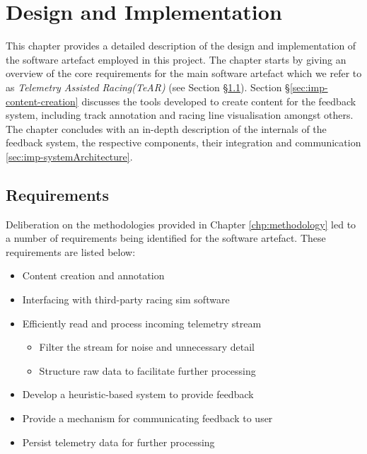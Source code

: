 \def \methodname {TeAR\xspace}
\def \methodnamefull {Telemetry Assisted Racing\xspace}

\chapter{Design and Implementation}
This chapter provides a detailed description of the design and implementation of the software artefact employed in this project. The chapter starts by giving an overview of the core requirements for the main software artefact which we refer to as \emph{\methodnamefull (\methodname)} (see Section \S\ref{sec:imp-requirements}). Section \S\ref{sec:imp-content-creation} discusses the tools developed to create content for the feedback system, including track annotation and racing line visualisation amongst others. The chapter concludes with an in-depth description of the internals of the feedback system, the respective components, their integration and communication \ref{sec:imp-systemArchitecture}.

\section{Requirements}
\label{sec:imp-requirements}
Deliberation on the methodologies provided in Chapter \ref{chp:methodology} led to a number of requirements being identified for the software artefact. These requirements are listed below:

\begin{itemize}
	\item Content creation and annotation 
	\item Interfacing with third-party racing sim software 
	\item Efficiently read and process incoming telemetry stream
	\begin{itemize}
		\item Filter the stream for noise and unnecessary detail
		\item Structure raw data to facilitate further processing
	\end{itemize}
	\item Develop a heuristic-based system to provide feedback
	\item Provide a mechanism for communicating feedback to user
	\item Persist telemetry data for further processing
\end{itemize}

